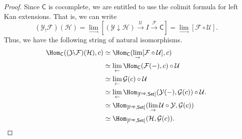 \documentclass[notes.tex]{subfiles}
\begin{document}
\begin{proof}
  Since $\mathsf{C}$ is cocomplete, we are entitled to use the colimit formula for left Kan extensions. That is, we can write
  \begin{equation*}
    (\mathcal{Y}_{!}\mathcal{F})(\mathcal{H}) = \lim_{\rightarrow} \left[ (\mathcal{Y} \downarrow \mathcal{H}) \overset{\mathcal{U}}{\to} I \overset{\mathcal{F}}{\to} \mathsf{C} \right] = \lim_{\rightarrow}\left[ \mathcal{F} \circ \mathcal{U} \right].
  \end{equation*}
  Thus, we have the following string of natural isomorphisms.
  \begin{align*}
    \Hom_{\mathsf{C}}((\mathcal{Y}_{!}\mathcal{F})(\mathcal{H}), c) &\simeq \Hom_{\mathsf{C}}(\lim_{\rightarrow} [\mathcal{F} \circ \mathcal{U}], c) \\
    &\simeq \lim_{\leftarrow} \Hom_{\mathsf{C}}(\mathcal{F}(-), c) \circ \mathcal{U} \\
    &\simeq \lim_{\leftarrow} \mathcal{G}(c) \circ \mathcal{U} \\
    &\simeq \lim_{\leftarrow} \Hom_{[\mathsf{I}^{\op}, \mathsf{Set}]}(\mathcal{Y}(-), \mathcal{G}(c)) \circ \mathcal{U}. \\
    &\simeq \Hom_{[\mathsf{I}^{\op}, \mathsf{Set}]}(\lim_{\rightarrow}\mathcal{U} \circ \mathcal{Y}, \mathcal{G}(c)) \\
    &\simeq \Hom_{[\mathsf{I}^{\op}, \mathsf{Set}]}(\mathcal{H}, \mathcal{G}(c)).
  \end{align*}
\end{proof}
\end{document}
